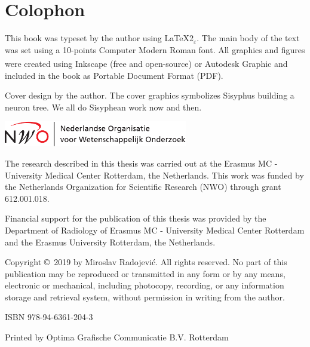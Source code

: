 %
%

\newpage
\setlength{\parindent}{0pt}
\thispagestyle{empty}

\section*{Colophon}

\bigskip
This book was typeset by the author using \LaTeX{}2{\LARGE $_{\varepsilon}$}. The main body of the text was set using a 10-points Computer Modern Roman font. All graphics and figures were created using Inkscape (free and open-source) or Autodesk \textsuperscript{\textregistered}Graphic and included in the book as Portable Document Format (PDF). %

\bigskip
Cover design by the author. The cover graphics symbolizes Sisyphus building a neuron tree. We all do Sisyphean work now and then.

\vfill
\includegraphics[height=3em]{./logos/nwo-nl}
\smallskip

The research described in this thesis was carried out at the Erasmus MC - University Medical Center Rotterdam, the Netherlands. This work was funded by the Netherlands Organization for Scientific Research (NWO) through grant 612.001.018.
\bigskip

Financial support for the publication of this thesis was provided by the Department of Radiology of Erasmus MC - University Medical Center Rotterdam and the Erasmus University Rotterdam, the Netherlands.

\bigskip

Copyright \copyright\ 2019 by Miroslav Radojevi\'{c}. All rights reserved. No part of this publication may be reproduced or transmitted in any form or by any means, electronic or mechanical, including photocopy, recording, or any information storage and retrieval system, without permission in writing from the author.

\bigskip
ISBN 978-94-6361-204-3

\smallskip
Printed by Optima Grafische Communicatie B.V. Rotterdam

\setlength{\parindent}{\myindent}

